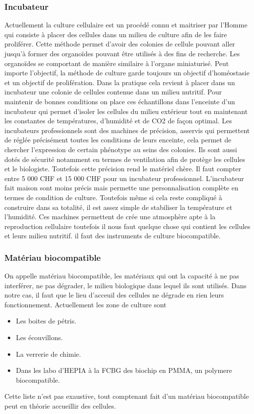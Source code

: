 \documentclass[a4paper, 11pt]{article}
\begin{document}
\subsubsection{Incubateur}
Actuellement la culture cellulaire est un procédé connu et maitriser par l'Homme qui consiste à placer des cellules dans 
un milieu de culture afin de les faire proliférer.
Cette méthode permet d'avoir des colonies de cellule pouvant aller jusqu'à former des organoïdes pouvant être utilisés 
à des fins de recherche. Les organoïdes se comportant de manière similaire à l'organe miniaturisé.
Peut importe l'objectif, la méthode de culture garde toujours un objectif d'homéostasie et un objectif de prolifération. Dans la pratique cela revient 
à placer dans un incubateur une colonie de cellules contenue dans un milieu nutritif.
Pour maintenir de bonnes conditions on place ces échantillons dans l'enceinte d'un incubateur qui permet d'isoler les cellules du milieu extérieur tout 
en maintenant les constantes de températures, d'humidité et de CO2 de façon optimal.
Les incubateurs professionnels sont des machines de précision, asservis qui permettent de réglée précisément toutes les conditions de leurs enceinte, cela permet de chercher l'expression de certain phénotype au seins des colonies.
Ils sont aussi dotés de sécurité notamment en termes de ventilation afin de protège les cellules et le biologiste. Toutefois cette précision rend le matériel chère.
Il faut compter entre 5 000 CHF et 15 000 CHF pour un incubateur professionnel.
L'incubateur fait maison sont moins précis mais permette une personnalisation complète en termes de condition de culture.
Toutefois même si cela reste compliqué à construire dans sa totalité, il est assez simple de stabiliser la température et l'humidité.
Ces machines permettent de crée une atmosphère apte à la reproduction cellulaire toutefois il nous faut quelque chose qui contient les cellules et leurs milieu nutritif.
il faut des instruments de culture biocompatible.
\subsubsection{Matériau biocompatible}
On appelle matériau biocompatible, les matériaux qui ont la capacité à ne pas interférer, 
ne pas dégrader, le milieu biologique dans lequel ils sont utilisés. Dans notre cas, il faut 
que le lieu d'acceuil des cellules ne dégrade en rien leurs fonctionnement.
Actuellement les zone de culture sont 
\begin{itemize}
    \item Les boites de pétris.
    \item Les écouvillons.
    \item La verrerie de chimie.
    \item Dans les labo d'HEPIA à la FCBG des biochip en PMMA, un polymere biocompatible.
\end{itemize}
Cette liste n'est pas exaustive, tout comptenant fait d'un matériau biocompatible peut en théorie 
accueillir des cellules.
\end{document}
